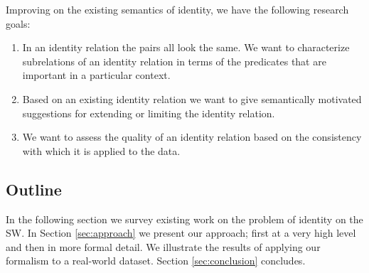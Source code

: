 Improving on the existing semantics of identity,
  we have the following research goals:
\begin{enumerate}
\item In an identity relation the pairs all look the same.
      We want to characterize subrelations of an identity relation in terms
      of the predicates that are important in a particular context.
\item Based on an existing identity relation we want to give semantically
      motivated suggestions for extending or limiting the identity relation.
\item We want to assess the quality of an identity relation based on
      the consistency with which it is applied to the data.
\end{enumerate}



\subsection{Outline}

In the following section we survey existing work
  on the problem of identity on the SW.
In Section \ref{sec:approach} we present our approach;
  first at a very high level and then in more formal detail.
We illustrate the results of applying our formalism to
  a real-world dataset.
Section \ref{sec:conclusion} concludes.

